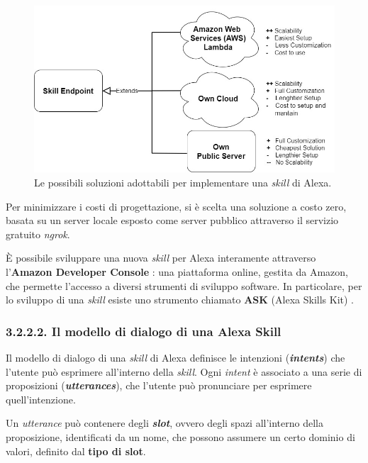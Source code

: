 \begin{figure}[!ht]
  \centering
  \includegraphics[scale=0.42]{resources/images/other/skill-endpoint-solutions.jpg}
  \caption{
    Le possibili soluzioni adottabili per implementare una \textit{skill} di
    Alexa.
  }
  \label{fig:figure3.6}
\end{figure}

Per minimizzare i costi di progettazione, si è scelta una soluzione a costo
zero, basata su un server locale esposto come server pubblico attraverso il
servizio gratuito \textit{ngrok}.

È possibile sviluppare una nuova \textit{skill} per Alexa interamente
attraverso l’\textbf{Amazon Developer Console} \cite{AMAZON_DEVELOPER_CONSOLE}:
una piattaforma online, gestita da Amazon, che permette l’accesso a diversi
strumenti di sviluppo software. In particolare, per lo sviluppo di una
\textit{skill} esiste uno strumento chiamato \textbf{ASK} (Alexa Skills Kit)
\cite{ASK}.

\subsubsection{3.2.2.2. Il modello di dialogo di una Alexa Skill}
\label{subsec:Sezione3.2.2.2}

Il modello di dialogo di una \textit{skill} di Alexa definisce le intenzioni
(\textit{\textbf{intents}}) che l’utente può esprimere all’interno della
\textit{skill}. Ogni \textit{intent} è associato a una serie di proposizioni
(\textit{\textbf{utterances}}), che l’utente può pronunciare per esprimere
quell’intenzione.

Un \textit{utterance} può contenere degli \textit{\textbf{slot}}, ovvero degli
spazi all’interno della proposizione, identificati da un nome, che possono
assumere un certo dominio di valori, definito dal \textbf{tipo di slot}.

